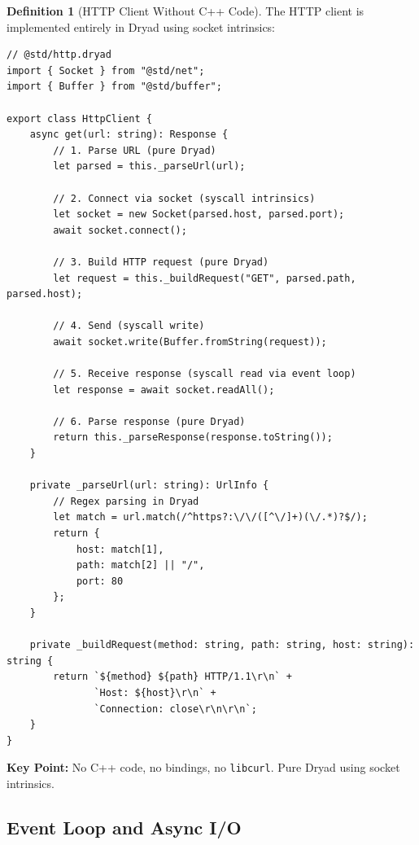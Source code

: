 \documentclass[12pt,a4paper]{article}
\theoremstyle{definition}
\newtheorem{definition}{Definition}[section]
\begin{document}
\begin{definition}[HTTP Client Without C++ Code]
The HTTP client is implemented entirely in Dryad using socket intrinsics:

\begin{lstlisting}[language=Dryad]
// @std/http.dryad
import { Socket } from "@std/net";
import { Buffer } from "@std/buffer";

export class HttpClient {
    async get(url: string): Response {
        // 1. Parse URL (pure Dryad)
        let parsed = this._parseUrl(url);
        
        // 2. Connect via socket (syscall intrinsics)
        let socket = new Socket(parsed.host, parsed.port);
        await socket.connect();
        
        // 3. Build HTTP request (pure Dryad)
        let request = this._buildRequest("GET", parsed.path, parsed.host);
        
        // 4. Send (syscall write)
        await socket.write(Buffer.fromString(request));
        
        // 5. Receive response (syscall read via event loop)
        let response = await socket.readAll();
        
        // 6. Parse response (pure Dryad)
        return this._parseResponse(response.toString());
    }
    
    private _parseUrl(url: string): UrlInfo {
        // Regex parsing in Dryad
        let match = url.match(/^https?:\/\/([^\/]+)(\/.*)?$/);
        return {
            host: match[1],
            path: match[2] || "/",
            port: 80
        };
    }
    
    private _buildRequest(method: string, path: string, host: string): string {
        return `${method} ${path} HTTP/1.1\r\n` +
               `Host: ${host}\r\n` +
               `Connection: close\r\n\r\n`;
    }
}
\end{lstlisting}

\textbf{Key Point:} No C++ code, no bindings, no \texttt{libcurl}. Pure Dryad using socket intrinsics.
\end{definition}

\subsection{Event Loop and Async I/O}
\end{document}
